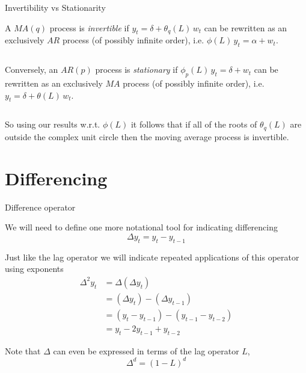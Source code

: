 \documentclass[11pt,ignorenonframetext,]{beamer}
\begin{document}
\begin{frame}[t]{Invertibility vs Stationarity}
\protect\hypertarget{invertibility-vs-stationarity}{}

A \(MA(q)\) process is \emph{invertible} if
\(y_t = \delta + \theta_q(L) \, w_t\) can be rewritten as an exclusively
\(AR\) process (of possibly infinite order), i.e.
\(\phi(L) \, y_t = \alpha + w_t\).

\(~\)

\pause

Conversely, an \(AR(p)\) process is \emph{stationary} if
\(\phi_p(L) \, y_t = \delta + w_t\) can be rewritten as an exclusively
\(MA\) process (of possibly infinite order), i.e.
\(y_t = \delta + \theta(L) \, w_t\).

\(~\)

\pause

So using our results w.r.t. \(\phi(L)\) it follows that if all of the
roots of \(\theta_q(L)\) are outside the complex unit circle then the
moving average process is invertible.

\end{frame}

\hypertarget{differencing}{%
\section{Differencing}\label{differencing}}

\begin{frame}{Difference operator}
\protect\hypertarget{difference-operator}{}

We will need to define one more notational tool for indicating
differencing \[ \Delta y_t = y_t - y_{t-1} \]

\pause

Just like the lag operator we will indicate repeated applications of
this operator using exponents \[ 
\begin{aligned}
\Delta^2 y_t 
  &= \Delta (\Delta y_t) \\
  &= (\Delta y_t) - (\Delta y_{t-1}) \\
  &= (y_t - y_{t-1}) - (y_{t-1} - y_{t-2}) \\
  &= y_t - 2y_{t-1}+y_{t-2}
\end{aligned}
\]

\pause

Note that \(\Delta\) can even be expressed in terms of the lag operator
\(L\), \[ \Delta^d = (1-L)^d \]

\end{frame}
\end{document}
